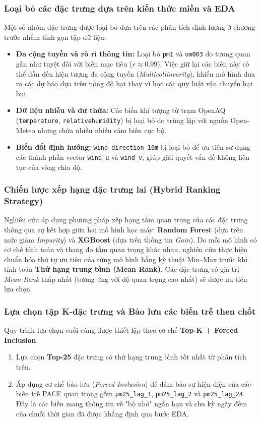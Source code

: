 \subsubsection{Loại bỏ các đặc trưng dựa trên kiến thức miền và EDA}
Một số nhóm đặc trưng được loại bỏ dựa trên các phân tích định lượng ở chương trước nhằm tinh gọn tập dữ liệu:
\begin{itemize}
    \item \textbf{Đa cộng tuyến và rò rỉ thông tin:} Loại bỏ \texttt{pm1} và \texttt{um003} do tương quan gần như tuyệt đối với biến mục tiêu ($r \approx 0.99$). Việc giữ lại các biến này có thể dẫn đến hiện tượng đa cộng tuyến (\textit{Multicollinearity}), khiến mô hình đưa ra các dự báo dựa trên nồng độ hạt thay vì học các quy luật vận chuyển hạt bụi.
    \item \textbf{Dữ liệu nhiễu và dư thừa:} Các biến khí tượng từ trạm OpenAQ (\texttt{temperature}, \texttt{relativehumidity}) bị loại bỏ do trùng lặp với nguồn Open-Meteo nhưng chứa nhiều nhiễu cảm biến cục bộ. 
    \item \textbf{Biến đổi định hướng:} \texttt{wind\_direction\_10m} bị loại bỏ để ưu tiên sử dụng các thành phần vector \texttt{wind\_u} và \texttt{wind\_v}, giúp giải quyết vấn đề không liên tục của vòng chia độ.
\end{itemize}
\subsubsection{Chiến lược xếp hạng đặc trưng lai (Hybrid Ranking Strategy)}
Nghiên cứu áp dụng phương pháp xếp hạng tầm quan trọng của các đặc trưng thông qua sự kết hợp giữa hai mô hình học máy: \textbf{Random Forest} (dựa trên mức giảm \textit{Impurity}) và \textbf{XGBoost} (dựa trên thông tin \textit{Gain}). 
Do mỗi mô hình có cơ chế tính toán và thang đo tầm quan trọng khác nhau, nghiên cứu thực hiện chuẩn hóa thứ tự ưu tiên của từng mô hình bằng kỹ thuật Min--Max trước khi tính toán \textbf{Thứ hạng trung bình (Mean Rank)}. Các đặc trưng có giá trị \textit{Mean Rank} thấp nhất (tương ứng với độ quan trọng cao nhất) sẽ được ưu tiên lựa chọn.
\subsubsection{Lựa chọn tập K-đặc trưng và Bảo lưu các biến trễ then chốt}
Quy trình lựa chọn cuối cùng được thiết lập theo cơ chế \textbf{Top-K + Forced Inclusion}:
\begin{enumerate}
    \item Lựa chọn \textbf{Top-25} đặc trưng có thứ hạng trung bình tốt nhất từ phân tích trên.
    \item Áp dụng cơ chế bảo lưu (\textit{Forced Inclusion}) để đảm bảo sự hiện diện của các biến trễ PACF quan trọng gồm \texttt{pm25\_lag\_1}, \texttt{pm25\_lag\_2} và \texttt{pm25\_lag\_24}. Đây là các biến mang thông tin về "bộ nhớ" ngắn hạn và chu kỳ ngày đêm của chuỗi thời gian đã được khẳng định qua bước EDA.
\end{enumerate}

